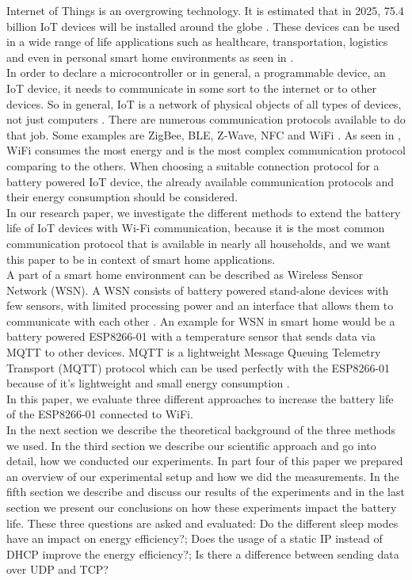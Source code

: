Internet of Things is an overgrowing technology. It is estimated that in 2025, 75.4 billion IoT devices will be installed around the globe \cite{lucero2016iot}. These devices can be used in a wide range of life applications such as healthcare, transportation, logistics and even in personal smart home environments as seen in \cite{6803174}.\\  
In order to declare a microcontroller or in general, a programmable device, an IoT device, it needs to communicate in some sort to the internet or to other devices. So in general, IoT is a network of physical objects of all types of devices, not just computers \cite{patel2016internet}. There are numerous communication protocols available to do that job. Some examples are ZigBee, BLE, Z-Wave, NFC and WiFi \cite{8079928}. As seen in \cite{8088226}, WiFi consumes the most energy and is the most complex communication protocol comparing to the others.  
When choosing a suitable connection protocol for a battery powered IoT device, the already available communication protocols and their energy consumption should be considered.\\
In our research paper, we investigate the different methods to extend the battery life of IoT devices with Wi-Fi communication, because it is the most common communication protocol that is available in nearly all households, and we want this paper to be in context of smart home applications.\\
A part of a smart home environment can be described as Wireless Sensor Network (WSN). A WSN consists of battery powered stand-alone devices with few sensors, with limited processing power and an interface that allows them to communicate with each other \cite{wsn}. 
An example for WSN in smart home would be a battery powered ESP8266-01 with a temperature sensor that sends data via MQTT to other devices.
MQTT is a lightweight Message Queuing Telemetry Transport (MQTT) protocol which can be used perfectly with the ESP8266-01 because of it's lightweight and small energy consumption \cite{kodali_mqtt_2016}.\\
In this paper, we evaluate three different approaches to increase the battery life of the ESP8266-01 connected to WiFi.\\
In the next section we describe the theoretical background of the three methods we used. 
In the third section we describe our scientific approach and go into detail, how we conducted our experiments.
In part four of this paper we prepared an overview of our experimental setup and how we did the measurements.
In the fifth section we describe and discuss our results of the experiments and in the last section we present our conclusions on how these experiments impact the battery life.
These three questions are asked and evaluated: Do the different sleep modes have an impact on energy efficiency?; Does the usage of a static IP instead of DHCP improve the energy efficiency?; Is there a difference between sending data over UDP and TCP?
